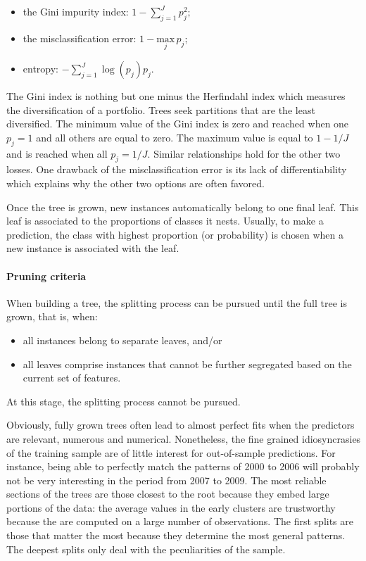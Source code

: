 \begin{itemize}
\item the Gini impurity index: $1 -\sum_{j=1}^Jp_j^2;$
\item the misclassification error: $1 -\underset{j}{\text{max}}\, p_j;$
\item entropy: $-\sum_{j=1}^J\log(p_j)p_j.$
\end{itemize}

The Gini index is nothing but one minus the Herfindahl index which measures the diversification of a portfolio. Trees seek partitions that are the least diversified. The minimum value of the Gini index is zero and reached when one $p_j=1$ and all others are equal to zero. The maximum value is equal to $1 -1/J$ and is reached when all $p_j=1/J$. Similar relationships hold for the other two losses. One drawback of the misclassification error is its lack of differentiability which explains why the other two options are often favored.

Once the tree is grown, new instances automatically belong to one final leaf. This leaf is associated to the proportions of classes it nests. Usually, to make a prediction, the class with highest proportion (or probability) is chosen when a new instance is associated with the leaf.

\paragraph{Pruning criteria}

When building a tree, the splitting process can be pursued until the full tree is grown, that is, when:

\begin{itemize}
\item all instances belong to separate leaves, and/or
\item all leaves comprise instances that cannot be further segregated based on the current set of features.
\end{itemize}

At this stage, the splitting process cannot be pursued.

Obviously, fully grown trees often lead to almost perfect fits when the predictors are relevant, numerous and numerical. Nonetheless, the fine grained idiosyncrasies of the training sample are of little interest for out-of-sample predictions. For instance, being able to perfectly match the patterns of 2000 to 2006 will probably not be very interesting in the period from 2007 to 2009. The most reliable sections of the trees are those closest to the root because they embed large portions of the data: the average values in the early clusters are trustworthy because the are computed on a large number of observations. The first splits are those that matter the most because they determine the most general patterns. The deepest splits only deal with the peculiarities of the sample.

